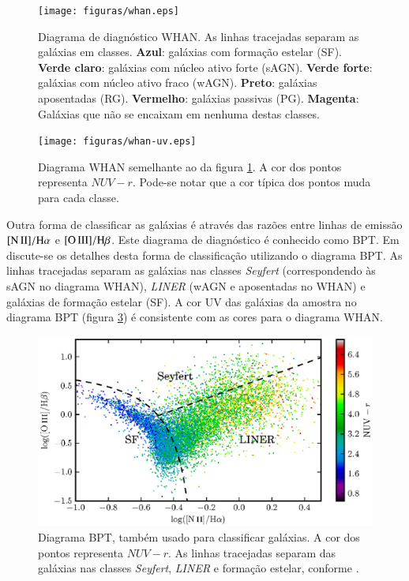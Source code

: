 \begin{figure}
	\texttt{[image: figuras/whan.eps]}
	\caption[Diagrama de diagnóstico WHAN.]
	{Diagrama de diagnóstico WHAN. As linhas tracejadas separam as galáxias
	em classes. \textbf{Azul}: galáxias com formação estelar (SF). \textbf{Verde
	claro}: galáxias com núcleo ativo forte (sAGN). \textbf{Verde forte}:
	galáxias com núcleo ativo fraco (wAGN). \textbf{Preto}: galáxias aposentadas
	(RG). \textbf{Vermelho}: galáxias passivas (PG). \textbf{Magenta}: Galáxias
	que não se encaixam em nenhuma destas classes.}
	\label{fig:Whan}
\end{figure}

\begin{figure}
	\texttt{[image: figuras/whan-uv.eps]}
	\caption[Cores ultravioleta no diagrama WHAN.]
	{Diagrama WHAN semelhante ao da figura \ref{fig:Whan}. A cor dos pontos
	representa $NUV-r$. Pode-se notar que a cor típica dos pontos muda para cada
	classe.}
	\label{fig:WhanUV}
\end{figure}

Outra forma de classificar as galáxias é através das razões entre linhas de
emissão $\nII/\Halpha$ e $\oIII/\Hbeta$. Este diagrama de diagnóstico é
conhecido como BPT. Em \citet{CidFernandes2010} discute-se os detalhes desta
forma de classificação utilizando o diagrama BPT. As linhas tracejadas separam
as galáxias nas classes {\em Seyfert} (correspondendo às sAGN no diagrama WHAN),
{\em LINER} (wAGN e aposentadas no WHAN) e galáxias de formação estelar (SF). A
cor UV das galáxias da amostra no diagrama BPT (figura \ref{fig:BPTUV}) é
consistente com as cores para o diagrama WHAN.

\begin{figure}
	\includegraphics{figuras/bpt-uv.eps}
	\caption[Cores ultravioleta no diagrama BPT.]
	{Diagrama BPT, também usado para classificar galáxias. A cor dos
	pontos representa $NUV-r$. As linhas tracejadas separam das galáxias nas
	classes {\em Seyfert}, {\em LINER} e formação estelar, conforme
	\citet[linhas S06 e K06 da tabela 1]{CidFernandes2010}.}
	\label{fig:BPTUV}
\end{figure}

